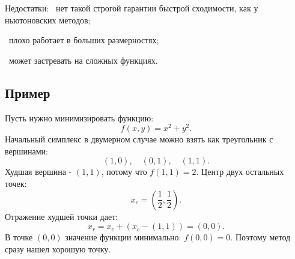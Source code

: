 \documentclass[12pt,a4paper]{article}
\begin{document}
Недостатки:
\noindent\textbullet\ нет такой строгой гарантии быстрой сходимости, как у ньютоновских методов;\par
\noindent\textbullet\ плохо работает в больших размерностях;\par
\noindent\textbullet\ может застревать на сложных функциях.\par

\subsection{Пример}
Пусть нужно минимизировать функцию:
\[
f(x,y)=x^2+y^2.
\]
Начальный симплекс в двумерном случае можно взять как треугольник с вершинами:
\[
(1,0),\quad (0,1),\quad (1,1).
\]
Худшая вершина - $(1,1)$, потому что $f(1,1)=2$.
Центр двух остальных точек:
\[
x_c=\left(\frac12,\frac12\right).
\]
Отражение худшей точки дает:
\[
x_r=x_c+(x_c-(1,1))=(0,0).
\]
В точке $(0,0)$ значение функции минимально: $f(0,0)=0$. Поэтому метод сразу нашел хорошую точку.
\end{document}
